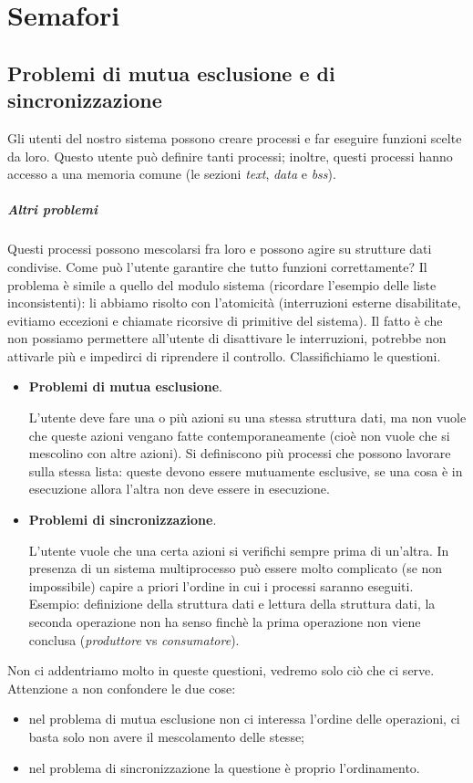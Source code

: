 \chapter{Semafori}
\section{Problemi di mutua esclusione e di sincronizzazione}
Gli utenti del nostro sistema possono creare processi e far eseguire funzioni scelte da loro. Questo utente può definire tanti processi; inoltre, questi processi hanno accesso a una memoria comune (le sezioni \emph{text}, \emph{data} e \emph{bss}).
\paragraph{Altri problemi} Questi processi possono mescolarsi fra loro e possono agire su strutture dati condivise. Come può l'utente garantire che tutto funzioni correttamente? Il problema è simile a quello del modulo sistema (ricordare l'esempio delle liste inconsistenti): li abbiamo risolto con l'atomicità (interruzioni esterne disabilitate, evitiamo eccezioni e chiamate ricorsive di primitive del sistema). Il fatto è che non possiamo permettere all'utente di disattivare le interruzioni, potrebbe non attivarle più e impedirci di riprendere il controllo. Classifichiamo le questioni.
\begin{itemize}
	\item \textbf{Problemi di mutua esclusione}.
	
	L'utente deve fare una o più azioni su una stessa struttura dati, ma non vuole che queste azioni vengano fatte contemporaneamente (cioè non vuole che si mescolino con altre azioni). Si definiscono più processi che possono lavorare sulla stessa lista: queste devono essere mutuamente esclusive, se una cosa è in esecuzione allora l'altra non deve essere in esecuzione.
	
	\item \textbf{Problemi di sincronizzazione}.
	
	L'utente vuole che una certa azioni si verifichi sempre prima di un'altra. In presenza di un sistema multiprocesso può essere molto complicato (se non impossibile) capire a priori l'ordine in cui i processi saranno eseguiti. Esempio: definizione della struttura dati e lettura della struttura dati, la seconda operazione non ha senso finchè la prima operazione non viene conclusa (\emph{produttore} vs \emph{consumatore}).
\end{itemize}
Non ci addentriamo molto in queste questioni, vedremo solo ciò che ci serve. Attenzione a non confondere le due cose:
\begin{itemize}
	\item nel problema di mutua esclusione non ci interessa l'ordine delle operazioni, ci basta solo non avere il mescolamento delle stesse;
	\item nel problema di sincronizzazione la questione è proprio l'ordinamento.
\end{itemize}

